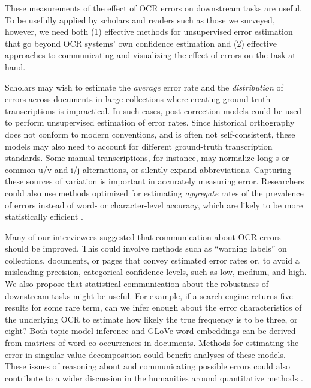 \documentclass[twoside,11pt]{report}
\begin{document}
These measurements of the effect of OCR errors on downstream tasks are useful. To be usefully applied by scholars and readers such as those we surveyed, however, we need both (1) effective methods for unsupervised error estimation that go beyond OCR systems' own confidence estimation and (2) effective approaches to communicating and visualizing the effect of errors on the task at hand.

Scholars may wish to estimate the \emph{average} error rate and the \emph{distribution} of errors across documents in large collections where creating ground-truth transcriptions is impractical. In such cases, post-correction models could be used to perform unsupervised estimation of error rates. Since historical orthography does not conform to modern conventions, and is often not self-consistent, these models may also need to account for different ground-truth transcription standards. Some manual transcriptions, for instance, may normalize long s or common u/v and i/j alternations, or silently expand abbreviations. Capturing these sources of variation is important in accurately measuring error. Researchers could also use methods optimized for estimating \emph{aggregate} rates of the prevalence of errors instead of word- or character-level accuracy, which are likely to be more statistically efficient \citep{hopkins10:_method_autom_nonpar_conten_analy_social_scien,king17:_comput_assis_keywor_docum_set}.

Many of our interviewees suggested that communication about OCR errors should be improved. This could involve methods such as ``warning labels'' on collections, documents, or pages that convey estimated error rates or, to avoid a misleading precision, categorical confidence levels, such as low, medium, and high. We also propose that statistical communication about the robustness of downstream tasks might be useful. For example, if a search engine returns five results for some rare term, can we infer enough about the error characteristics of the underlying OCR to estimate how likely the true frequency is to be three, or eight? Both topic model inference and GLoVe word embeddings can be derived from matrices of word co-occurrences in documents. Methods for estimating the error in singular value decomposition could benefit analyses of these models. These issues of reasoning about and communicating possible errors could also contribute to a wider discussion in the humanities around quantitative methods \citep[\emph{passim}]{piper18:_enumer}.
\end{document}
